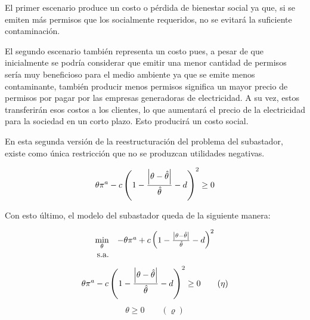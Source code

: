 El primer escenario produce un costo o pérdida de bienestar social ya que, si se emiten más permisos que los socialmente requeridos, no se evitará la suficiente contaminación. 
\vspace{2.5mm}

El segundo escenario también representa un costo pues, a pesar de que inicialmente se podría considerar que emitir una menor cantidad de permisos sería muy beneficioso para el medio ambiente ya que se emite menos contaminante, también producir menos permisos significa un mayor precio de permisos por pagar por las empresas generadoras de electricidad. A su vez, estos transferirán esos costos a los clientes, lo que aumentará el precio de la electricidad para la sociedad en un corto plazo. Esto producirá un costo social. 
\vspace{2.5mm}

En esta segunda versión de la reestructuración del problema del subastador, existe como única restricción que no se produzcan utilidades negativas.
\vspace{2.5mm}

\begin{equation}
\begin{array}{rrclcl}
\displaystyle \theta \pi^a - c\left(1-\frac{\abs{\theta - \hat{\theta}}}{\hat{\theta}}-d\right)^2 \geq 0  \\
\end{array}
\end{equation}

Con esto último, el modelo del subastador queda de la siguiente manera:

\begin{equation}
\begin{array}{rrclcl}
\displaystyle \min_{\theta} & -\theta \pi^a + c\left(1-\frac{\abs{\theta - \hat{\theta}}}{\hat{\theta}}-d\right)^2 \\\textrm{s.a.} \label{fo:social}\\
\end{array}
\end{equation}
\begin{equation}
\begin{array}{rrclcl}
\displaystyle \theta \pi^a - c\left(1-\frac{\abs{\theta - \hat{\theta}}}{\hat{\theta}}-d\right)^2 \geq 0 \qquad (\eta)\label{social:r1}
\end{array}
\end{equation}
\begin{equation}
\begin{array}{rrclcl}
\theta \geq 0 \qquad (\varrho)\label{social:r11}
\end{array}
\end{equation}

